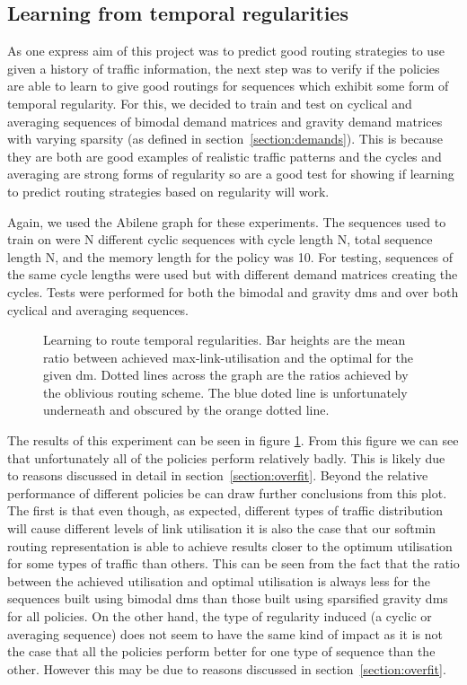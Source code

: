 \subsection{Learning from temporal regularities}
As one express aim of this project was to predict good routing strategies to use given a history of traffic information, the next step was to verify if the policies are able to learn to give good routings for sequences which exhibit some form of temporal regularity. For this, we decided to train and test on cyclical and averaging sequences of bimodal demand matrices and gravity demand matrices with varying sparsity (as defined in section~\ref{section:demands}). This is because they are both are good examples of realistic traffic patterns and the cycles and averaging are strong forms of regularity so are a good test for showing if learning to predict routing strategies based on regularity will work.

Again, we used the Abilene graph for these experiments. The sequences used to train on were N different cyclic sequences with cycle length N, total sequence length N, and the memory length for the policy was 10. For testing, sequences of the same cycle lengths were used but with different demand matrices creating the cycles. Tests were performed for both the bimodal and gravity \acp{dm} and over both cyclical and averaging sequences.

\begin{figure}
    \centering
    
    \caption{Learning to route temporal regularities. Bar heights are the mean ratio between achieved max-link-utilisation and the optimal for the given \ac{dm}. Dotted lines across the graph are the ratios achieved by the oblivious routing scheme. The blue doted line is unfortunately underneath and obscured by the orange dotted line.}
    \label{fig:exp_cyclic}
\end{figure}

The results of this experiment can be seen in figure \ref{fig:exp_cyclic}. From this figure we can see that unfortunately all of the policies perform relatively badly. This is likely due to reasons discussed in detail in section~\ref{section:overfit}. Beyond the relative performance of different policies be can draw further conclusions from this plot. The first is that even though, as expected, different types of traffic distribution will cause different levels of link utilisation it is also the case that our softmin routing representation is able to achieve results closer to the optimum utilisation for some types of traffic than others. This can be seen from the fact that the ratio between the achieved utilisation and optimal utilisation is always less for the sequences built using bimodal \acp{dm} than those built using sparsified gravity \acp{dm} for all policies. On the other hand, the type of regularity induced (a cyclic or averaging sequence) does not seem to have the same kind of impact as it is not the case that all the policies perform better for one type of sequence than the other. However this may be due to reasons discussed in section~\ref{section:overfit}.

